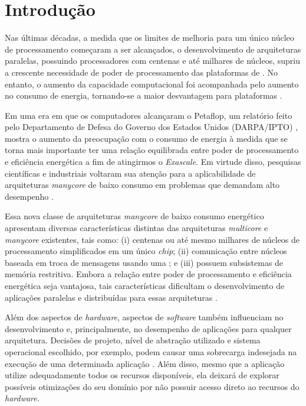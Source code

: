 \documentclass[
  12pt,       %
  openright,      %
  twoside,      %
  a4paper,      %
  english,      %
  brazil,       %
  ]{abntex2}
\begin{document}
\chapter{Introdução}
\label{cap:introducao}

    Nas últimas décadas, a medida que os limites de melhoria para um único
    núcleo de processamento começaram a ser alcançados, o desenvolvimento
    de arquiteturas paralelas, possuindo processadores com centenas e até
    milhares de núcleos, supriu a crescente necessidade de poder de
    processamento das plataformas de \hpc.
    No entanto, o aumento da capacidade computacional foi acompanhada pelo
    aumento no consumo de energia, tornando-se a maior desvantagem para
    plataformas \hpc.
    
    Em uma era em que os computadores alcançaram o Petaflop, um relatório
    feito pelo Departamento de Defesa do Governo dos Estados Unidos
    (DARPA/IPTO) \cite{darpa:exascale}, mostra o aumento da preocupação
    com o consumo de energia à medida que se torna mais importante ter uma
    relação equilibrada entre poder de processamento e eficiência energética a fim de
    atingirmos o \textit{Exascale}. Em virtude disso, pesquisas científicas
    e industriais voltaram sua atenção para a aplicabilidade de arquiteturas
    \textit{manycore} de baixo consumo em problemas que demandam alto
    desempenho \cite{Castro-SBAC-PAD:2014, Castro-PARCO:2016}.
    
    Essa nova classe de arquiteturas \textit{manycore} de baixo consumo
    energético apresentam diversas características distintas das arquiteturas
    \textit{multicore} e \textit{manycore} existentes, tais como: 
    (i) centenas ou até mesmo milhares de núcleos de processamento
    simplificados em um único \textit{chip};
    (ii) comunicação entre núcleos baseada em troca de mensagens usando
    uma \noc; e 
    (iii) possuem subsistemas de memória restritiva.
    Embora a relação entre poder de processamento e eficiência energética
    seja vantajosa, tais características dificultam o desenvolvimento de aplicações
    paralelas e distribuídas para essas arquiteturas
     \cite{Castro-Souza-CCPE:2016, Castro-PARCO:2016, os:rmen}.
    
    Além dos aspectos de \textit{hardware}, aspectos de \textit{software} também influenciam
    no desenvolvimento e, principalmente, no desempenho de aplicações para
    qualquer arquitetura.
    Decisões de projeto, nível de abstração utilizado e sistema operacional
    escolhido, por exemplo, podem causar uma sobrecarga indesejada na execução
    de uma determinada aplicação \cite{Appel:1991:VMP:106972.106984, Cao:1994:IPA:1267638.1267651, Harty:1992:APM:143365.143511, Krueger:1993:TDA:165854.165867, Stonebraker:1981:OSS:358699.358703, Levy:Exception, hunt_singularity:_2007}.
    Além disso, mesmo que a aplicação utilize adequadamente todos os recursos
    disponíveis, ela deixará de explorar possíveis otimizações do seu
    domínio por não possuir acesso direto ao recursos do \textit{hardware}.
    
\end{document}
